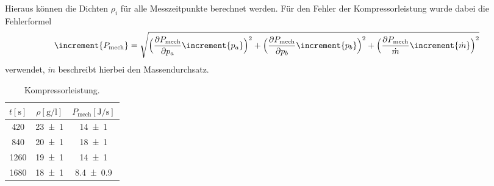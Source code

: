 Hieraus können die Dichten $\rho_i$ für alle Messzeitpunkte berechnet werden.
Für den Fehler der Kompressorleistung wurde dabei die Fehlerformel
\begin{equation}
\increment{P_{\text{mech}}} = \sqrt{\Bigl(\frac{\partial P_{\text{mech}}}{\partial p_a}\increment{p_a}\Bigr)^2 + \Bigl( \frac{\partial P_{\text{mech}}}{\partial p_b}\increment{p_b}\Bigr)^2 + \Bigl( \frac{\partial P_{\text{mech}}}{\dot{m}} \increment{\dot{m}}  \Bigr)^2}
\end{equation}
verwendet, $\dot{m}$ beschreibt hierbei den Massendurchsatz.

\begin{table}
  \centering
  \caption{Kompressorleistung.}
  \label{tab:tabelle5}
\begin{tabular}{c c c}
  \toprule
  {$t [\si{\second}]$} & {$\rho [\si{\gram\per\litre}]$} & {$P_{\text{mech}} [\si{\joule\per\second}]$}\\
  \midrule
  \num{420} & \num{23 +- 1} & \num{14 +- 1} \\
  \num{840} & \num{20 +- 1} & \num{18 +- 1} \\
  \num{1260} & \num{19 +- 1} & \num{14 +- 1} \\
  \num{1680} & \num{18 +- 1} & \num{8.4 +- 0.9} \\
  \bottomrule
\end{tabular}
\end{table}

